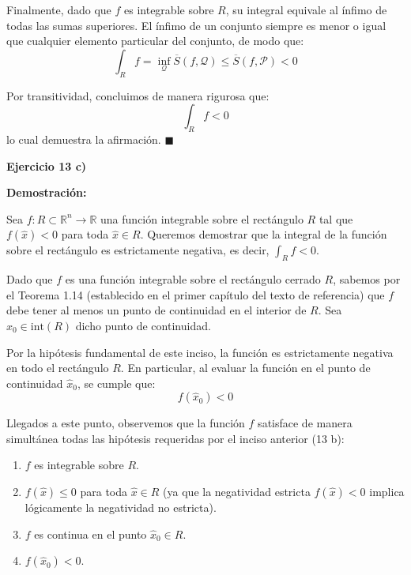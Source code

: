 \documentclass[11pt,letterpaper]{article}
\begin{document}
Finalmente, dado que $f$ es integrable sobre $R$, su integral equivale al ínfimo de todas las sumas superiores. El ínfimo de un conjunto siempre es menor o igual que cualquier elemento particular del conjunto, de modo que:
\begin{equation*}
\int_R f = \inf_{\mathcal{Q}} \overline{S}(f, \mathcal{Q}) \le \overline{S}(f, \mathcal{P}) < 0
\end{equation*}

Por transitividad, concluimos de manera rigurosa que:
\begin{equation*}
\int_R f < 0
\end{equation*}
lo cual demuestra la afirmación. \hfill $\blacksquare$

\textbf{Ejercicio 13 c)}

\textbf{Demostración:}

Sea $f: R \subset \mathbb{R}^n \rightarrow \mathbb{R}$ una función integrable sobre el rectángulo $R$ tal que $f(\hat{x}) < 0$ para toda $\hat{x} \in R$. Queremos demostrar que la integral de la función sobre el rectángulo es estrictamente negativa, es decir, $\int_R f < 0$.

Dado que $f$ es una función integrable sobre el rectángulo cerrado $R$, sabemos por el Teorema 1.14 (establecido en el primer capítulo del texto de referencia) que $f$ debe tener al menos un punto de continuidad en el interior de $R$. Sea $\hat{x}_0 \in \text{int}(R)$ dicho punto de continuidad.

Por la hipótesis fundamental de este inciso, la función es estrictamente negativa en todo el rectángulo $R$. En particular, al evaluar la función en el punto de continuidad $\hat{x}_0$, se cumple que:
\begin{equation*}
f(\hat{x}_0) < 0
\end{equation*}

Llegados a este punto, observemos que la función $f$ satisface de manera simultánea todas las hipótesis requeridas por el inciso anterior (13 b):
\begin{enumerate}
    \item $f$ es integrable sobre $R$.
    \item $f(\hat{x}) \le 0$ para toda $\hat{x} \in R$ (ya que la negatividad estricta $f(\hat{x}) < 0$ implica lógicamente la negatividad no estricta).
    \item $f$ es continua en el punto $\hat{x}_0 \in R$.
    \item $f(\hat{x}_0) < 0$.
\end{enumerate}
\end{document}
